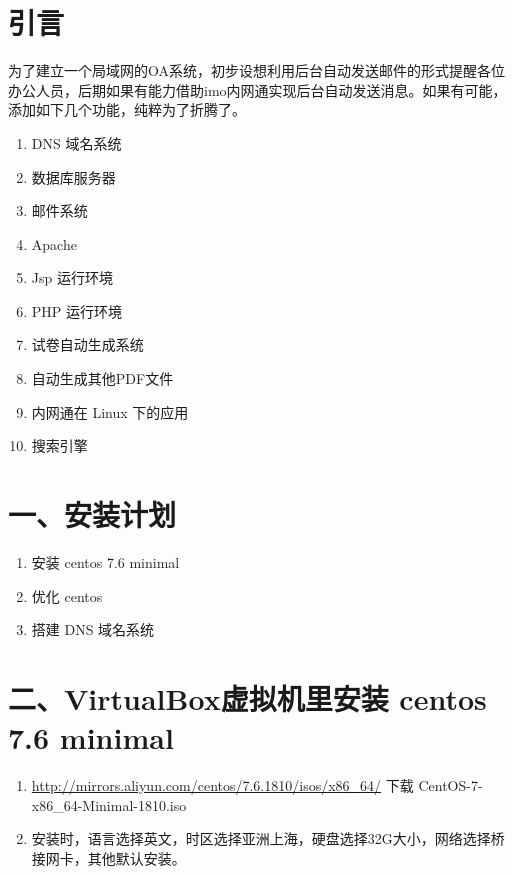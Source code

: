 \documentclass[doctor,openright,twoside]{sjtuthesis}
\providecommand{\tightlist}{%
    \setlength{\itemsep}{0pt}\setlength{\parskip}{0pt}}
\theoremstyle{plain}
\theoremstyle{definition}
\theoremstyle{remark}
\theoremstyle{ocrenumbox}
\theoremstyle{plain}
\begin{document}
\hypertarget{section-131}{%
\section{引言}\label{section-131}}

为了建立一个局域网的OA系统，初步设想利用后台自动发送邮件的形式提醒各位办公人员，后期如果有能力借助imo内网通实现后台自动发送消息。如果有可能，添加如下几个功能，纯粹为了折腾了。

\begin{enumerate}
\def\labelenumi{\arabic{enumi}.}
\tightlist
\item
  DNS 域名系统
\item
  数据库服务器
\item
  邮件系统
\item
  Apache
\item
  Jsp 运行环境
\item
  PHP 运行环境
\item
  试卷自动生成系统
\item
  自动生成其他PDF文件
\item
  内网通在 Linux 下的应用
\item
  搜索引擎
\end{enumerate}

\hypertarget{section-132}{%
\section{一、安装计划}\label{section-132}}

\begin{enumerate}
\def\labelenumi{\arabic{enumi}.}
\tightlist
\item
  安装 centos 7.6 minimal
\item
  优化 centos
\item
  搭建 DNS 域名系统
\end{enumerate}

\hypertarget{virtualbox-centos-7.6-minimal}{%
\section{二、VirtualBox虚拟机里安装 centos 7.6 minimal}\label{virtualbox-centos-7.6-minimal}}

\begin{enumerate}
\def\labelenumi{\arabic{enumi}.}
\tightlist
\item
  \url{http://mirrors.aliyun.com/centos/7.6.1810/isos/x86_64/} 下载 CentOS-7-x86\_64-Minimal-1810.iso
\item
  安装时，语言选择英文，时区选择亚洲上海，硬盘选择32G大小，网络选择桥接网卡，其他默认安装。
\end{enumerate}
\end{document}
